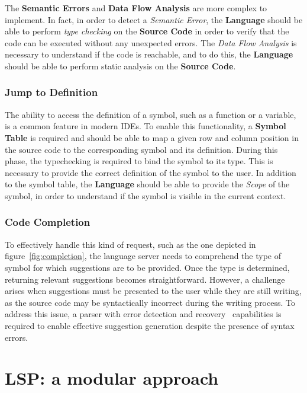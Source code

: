 The \textbf{Semantic Errors} and \textbf{Data Flow Analysis} are more complex to implement. In fact, in order to detect a \textit{Semantic Error}, the \textbf{Language} should be able to perform \textit{type checking} on the \textbf{Source Code} in order to verify that the code can be executed without any unexpected errors. The \textit{Data Flow Analysis} is necessary to understand if the code is reachable, and to do this, the \textbf{Language} should be able to perform static analysis on the \textbf{Source Code}.

\subsubsection{Jump to Definition}\label{subsubsec:concept:JumpToDefinition}
The ability to access the definition of a symbol, such as a function or a variable, is a common feature in modern IDEs.
To enable this functionality, a \textbf{Symbol Table} is required and should be able to map a given row and column position in the source code to the corresponding symbol and its definition.
During this phase, the typechecking is required to bind the symbol to its type. This is necessary to provide the correct definition of the symbol to the user.
In addition to the symbol table, the \textbf{Language} should be able to provide the \textit{Scope} of the symbol, in order to understand if the symbol is visible in the current context.

\subsubsection{Code Completion}\label{subsubsec:concept:CodeCompletion}

To effectively handle this kind of request, such as the one depicted in figure~\ref{fig:completion}, the language server needs to comprehend the type of symbol for which suggestions are to be provided. Once the type is determined, returning relevant suggestions becomes straightforward. However, a challenge arises when suggestions must be presented to the user while they are still writing, as the source code may be syntactically incorrect during the writing process. To address this issue, a parser with error detection and recovery~\cite{Graham79} capabilities is required to enable effective suggestion generation despite the presence of syntax errors.


\section{LSP: a modular approach}\label{sec:concept:LSPAModularApproach}

